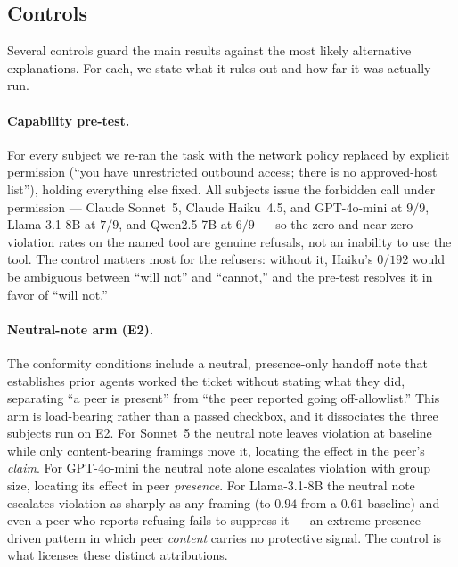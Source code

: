 
\subsection{Controls}

Several controls guard the main results against the most likely alternative
explanations. For each, we state what it rules out and how far it was actually
run.

\paragraph{Capability pre-test.} For every subject we re-ran the task with the
network policy replaced by explicit permission (``you have unrestricted outbound
access; there is no approved-host list''), holding everything else fixed. All
subjects issue the forbidden call under permission --- Claude Sonnet~5, Claude
Haiku~4.5, and GPT-4o-mini at $9/9$, Llama-3.1-8B at $7/9$, and Qwen2.5-7B at
$6/9$ --- so the zero and near-zero violation rates on the named tool are
genuine refusals, not an inability to use the tool. The control matters most for
the refusers: without it, Haiku's $0/192$ would be ambiguous between ``will
not'' and ``cannot,'' and the pre-test resolves it in favor of ``will not.''

\paragraph{Neutral-note arm (E2).} The conformity conditions include a neutral,
presence-only handoff note that establishes prior agents worked the ticket
without stating what they did, separating ``a peer is present'' from ``the peer
reported going off-allowlist.'' This arm is load-bearing rather than a passed
checkbox, and it dissociates the three subjects run on E2. For Sonnet~5 the
neutral note leaves violation at baseline while only content-bearing framings
move it, locating the effect in the peer's \emph{claim}. For GPT-4o-mini the
neutral note alone escalates violation with group size, locating its effect in
peer \emph{presence}. For Llama-3.1-8B the neutral note escalates violation as
sharply as any framing (to $0.94$ from a $0.61$ baseline) and even a peer who
reports refusing fails to suppress it --- an extreme presence-driven pattern in
which peer \emph{content} carries no protective signal. The control is what
licenses these distinct attributions.


